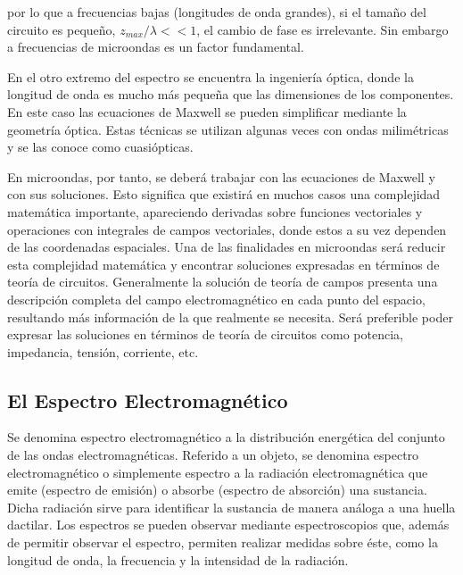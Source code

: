 \documentclass[12pt]{article}
\begin{document}
por lo que a frecuencias bajas (longitudes de onda grandes), si el tama\~no del circuito es peque\~no, $z_{max}/\lambda <<1$, el cambio de fase es irrelevante. Sin embargo a frecuencias de microondas es un factor fundamental.

\vspace{0.4cm}
En el otro extremo del espectro se encuentra la ingenier\'ia \'optica, donde la longitud de onda es mucho m\'as peque\~na que las dimensiones de los componentes. En este caso las ecuaciones de Maxwell se pueden simplificar mediante la geometr\'ia \'optica. Estas t\'ecnicas se utilizan algunas veces con ondas milim\'etricas y se las conoce como cuasi\'opticas.
\vspace{0.4cm}

En microondas, por tanto, se deber\'a trabajar con las ecuaciones de Maxwell y con sus soluciones. Esto significa que existir\'a en muchos casos una complejidad matem\'atica importante, apareciendo derivadas sobre funciones vectoriales y operaciones con integrales de campos vectoriales, donde estos a su vez dependen de las coordenadas espaciales. Una de las finalidades en microondas ser\'a reducir esta complejidad matem\'atica y encontrar soluciones expresadas en t\'erminos de teor\'ia de circuitos. Generalmente la soluci\'on de teor\'ia de campos presenta una descripci\'on completa del campo electromagn\'etico en cada punto del espacio, resultando m\'as informaci\'on de la que realmente se necesita. Ser\'a preferible poder expresar las soluciones en t\'erminos de teor\'ia de circuitos como potencia, impedancia, tensi\'on, corriente, etc.


\subsection{El Espectro Electromagn\'etico}
Se denomina espectro electromagn\'etico a la distribuci\'on energ\'etica del conjunto de las ondas electromagn\'eticas. Referido a un objeto, se denomina espectro electromagn\'etico o simplemente espectro a la radiaci\'on electromagn\'etica que emite (espectro de emisi\'on) o absorbe (espectro de absorci\'on) una sustancia. Dicha radiaci\'on sirve para identificar la sustancia de manera an\'aloga a una huella dactilar. Los espectros se pueden observar mediante espectroscopios que, adem\'as de permitir observar el espectro, permiten realizar medidas sobre \'este, como la longitud de onda, la frecuencia y la intensidad de la radiaci\'on.
\vspace{0.4cm}
\end{document}
